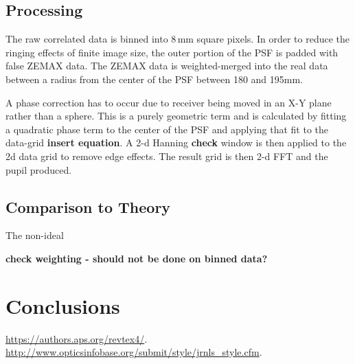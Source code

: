 \documentclass[osajnl,twocolumn,showpacs,superscriptaddress,11pt]{revtex4-1} %
\begin{document}
\subsection{Processing}

The raw correlated data is binned into 8\,mm square pixels. In order to reduce the ringing effects of finite image size, the outer portion of the PSF is padded with false ZEMAX data.  The ZEMAX data is weighted-merged into the real data between a radius from the center of the PSF between 180 and 195mm.

A phase correction has to occur due to receiver being moved in an X-Y plane rather than a sphere.  This is a purely geometric term and is calculated by fitting a quadratic phase term to the center of the PSF and applying that fit to the data-grid {\bf insert equation}. A 2-d Hanning {\bf check} window is then applied to the 2d data grid to remove edge effects.  The result grid is then 2-d FFT and the pupil produced. 

\subsection{Comparison to Theory}

The non-ideal

{\bf check weighting - should not be done on binned data?}

\section{Conclusions}

\begin{thebibliography}{99}

 \url{https://authors.aps.org/revtex4/}.
 \url{http://www.opticsinfobase.org/submit/style/jrnls_style.cfm}.

\end{thebibliography}
\end{document}
